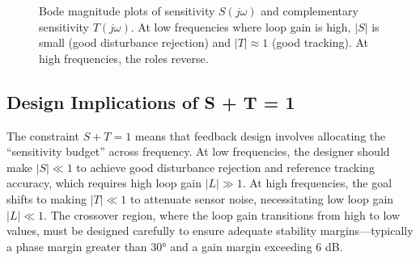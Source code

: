\begin{figure}[htbp]
\centering
{}
\caption{Bode magnitude plots of sensitivity $S(j\omega)$ and complementary sensitivity $T(j\omega)$. At low frequencies where loop gain is high, $|S|$ is small (good disturbance rejection) and $|T| \approx 1$ (good tracking). At high frequencies, the roles reverse.}
\label{fig:s_t_bode}
\end{figure}

\subsection{Design Implications of S + T = 1}

The constraint $S + T = 1$ means that feedback design involves allocating the ``sensitivity budget'' across frequency. At low frequencies, the designer should make $|S| \ll 1$ to achieve good disturbance rejection and reference tracking accuracy, which requires high loop gain $|L| \gg 1$. At high frequencies, the goal shifts to making $|T| \ll 1$ to attenuate sensor noise, necessitating low loop gain $|L| \ll 1$. The crossover region, where the loop gain transitions from high to low values, must be designed carefully to ensure adequate stability margins---typically a phase margin greater than $30°$ and a gain margin exceeding $6$ dB.

